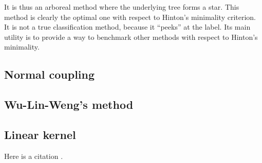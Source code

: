 \documentclass[twoside,11pt]{article}
\begin{document}
It is thus an arboreal method where the underlying tree forms a star. This method is clearly the optimal one with respect to Hinton's minimality criterion. It is not a true classification method, because it ``peeks'' at the label. Its main utility is to provide a way to benchmark other methods with respect to Hinton's minimality.

%
%

\subsection{Normal coupling}



\subsection{Wu-Lin-Weng's method}



\subsection{Linear kernel}



Here is a citation \cite{chow:68}.
\end{document}

